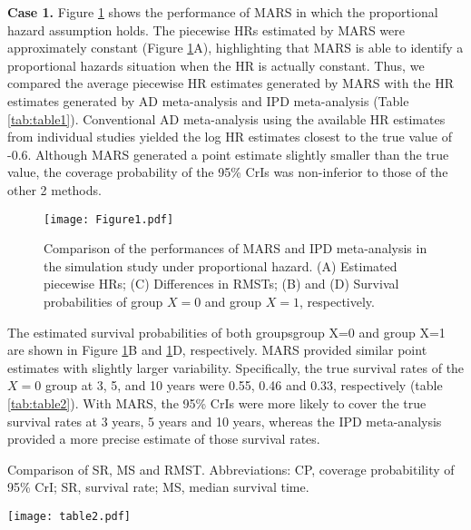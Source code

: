 \documentclass[12pt]{article}
\theoremstyle{mystyle}
\begin{document}
\noindent\textbf{Case 1.} \hspace{\parindent}
Figure \ref{fig:FIG1} shows the performance of MARS in which the proportional hazard assumption holds. The piecewise HRs estimated by MARS were approximately constant (Figure \ref{fig:FIG1}A), highlighting that MARS is able to identify a proportional hazards situation when the HR is actually constant. Thus, we compared the average piecewise HR estimates generated by MARS with the HR estimates generated by AD meta-analysis and IPD meta-analysis (Table \ref{tab:table1}).
Conventional AD meta-analysis using the available HR estimates from individual studies yielded the log HR estimates closest to the true value of -0.6. Although MARS generated a point estimate slightly smaller than the true value, the coverage probability of the 95\% CrIs was non-inferior to those of the other 2 methods. 

\vspace{10pt}
\begin{figure}[!ht]
\begin{center}
\texttt{[image: Figure1.pdf]}
\end{center}\vspace{-25pt}
\caption{\linespread{1.3}\selectfont{}\label{fig:FIG1}{Comparison of the performances of MARS and IPD meta-analysis in the simulation study under proportional hazard. (A) Estimated piecewise HRs; (C) Differences in RMSTs; (B) and (D) Survival probabilities of group $X=0$ and group $X=1$, respectively.}}\vspace{10pt}
\end{figure}

The estimated survival probabilities of both groupsgroup X=0 and group X=1  are shown in Figure \ref{fig:FIG1}B and \ref{fig:FIG1}D, respectively. MARS provided similar point estimates with slightly larger variability. Specifically, the true survival rates of the $X=0$ group at 3, 5, and 10 years were 0.55, 0.46 and 0.33, respectively (table \ref{tab:table2}). With MARS, the 95\% CrIs were more likely to cover the true survival rates at 3 years, 5 years and 10 years, whereas the IPD meta-analysis provided a more precise estimate of those survival rates. 


\begin{table}[ht]
\caption{\label{tab:table2} Comparison of SR, MS and RMST. Abbreviations: CP, coverage probabitility of 95\% CrI; SR, survival rate; MS, median survival time.}\vspace{10pt}
\texttt{[image: table2.pdf]}
\vspace{-45pt}
\end{table}
\end{document}
